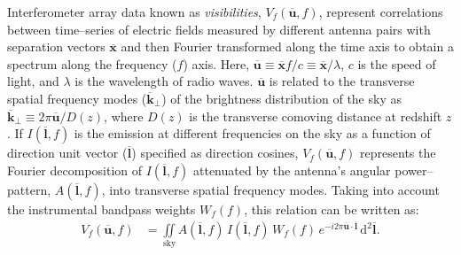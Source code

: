 \documentclass[preprint2,iop,numberedappendix]{emulateapj}
\newcommand{\dif}{\mathrm{d}}
\begin{document}
Interferometer array data known as {\it visibilities}, $V_f(\overline{\mathbf{u}},f)$, represent correlations between time--series of electric fields measured by different antenna pairs with separation vectors $\overline{\mathbf{x}}$ and then Fourier transformed along the time axis to obtain a spectrum along the frequency ($f$) axis. Here, $\overline{\mathbf{u}}\equiv \overline{\mathbf{x}}f/c \equiv \overline{\mathbf{x}}/\lambda$, $c$ is the speed of light, and $\lambda$ is the wavelength of radio waves. $\overline{\mathbf{u}}$ is related to the transverse spatial frequency modes ($\overline{\mathbf{k}}_\perp$) of the brightness distribution of the sky as $\overline{\mathbf{k}}_\perp \equiv 2\pi\overline{\mathbf{u}}/D(z)$, where $D(z)$ is the transverse comoving distance at redshift $z$. If $I(\overline{\mathbf{l}},f)$ is the emission at different frequencies on the sky as a function of direction unit vector ($\overline{\mathbf{l}}$) specified as direction cosines, $V_f(\overline{\mathbf{u}},f)$ represents the Fourier decomposition of $I(\overline{\mathbf{l}},f)$ attenuated by the antenna's angular power--pattern, $A(\overline{\mathbf{l}},f)$, into transverse spatial frequency modes. Taking into account the instrumental bandpass weights $W_f(f)$, this relation can be written as:
\begin{align}\label{eqn:obsvis}
  V_f(\overline{\mathbf{u}},f) &= \iint\limits_\textrm{sky} A(\overline{\mathbf{l}},f)\,I(\overline{\mathbf{l}},f)\,W_f(f)\,e^{-i2\pi \overline{\mathbf{u}}\cdot\overline{\mathbf{l}}}\,\dif^2 \overline{\mathbf{l}}.
\end{align}
\end{document}
